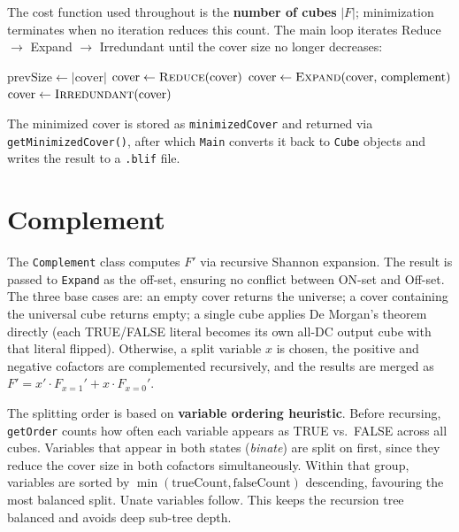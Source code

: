 The cost function used throughout is the \textbf{number of cubes} $|F|$; minimization terminates when no iteration reduces this count. The main loop iterates Reduce $\to$ Expand $\to$ Irredundant until the cover size no longer decreases:

\begin{algorithm}
\caption{Espresso main loop}
\begin{algorithmic}[1]
\Repeat
    \State $\text{prevSize} \gets |\text{cover}|$
    \State $\text{cover} \gets \textsc{Reduce}(\text{cover})$
    \State $\text{cover} \gets \textsc{Expand}(\text{cover},\, \text{complement})$
    \State $\text{cover} \gets \textsc{Irredundant}(\text{cover})$
\end{algorithmic}
\end{algorithm}

\noindent The minimized cover is stored as \texttt{minimizedCover} and returned via \texttt{getMinimizedCover()}, after which \texttt{Main} converts it back to \texttt{Cube} objects and writes the result to a \texttt{.blif} file.

\section{Complement}

The \texttt{Complement} class computes $F'$ via recursive Shannon expansion. The result is passed to \texttt{Expand} as the off-set, ensuring no conflict between ON-set and Off-set. The three base cases are: an empty cover returns the universe; a cover containing the universal cube returns empty; a single cube applies De Morgan's theorem directly (each TRUE/FALSE literal becomes its own all-\ac{DC} output cube with that literal flipped). Otherwise, a split variable $x$ is chosen, the positive and negative cofactors are complemented recursively, and the results are merged as $F' = x' \cdot F_{x=1}' + x \cdot F_{x=0}'$.

The splitting order is based on  \textbf{variable ordering heuristic}. Before recursing, \texttt{getOrder} counts how often each variable appears as TRUE vs.\ FALSE across all cubes. Variables that appear in both states (\emph{binate}) are split on first, since they reduce the cover size in both cofactors simultaneously. Within that group, variables are sorted by $\min(\text{trueCount}, \text{falseCount})$ descending, favouring the most balanced split. Unate variables follow. This keeps the recursion tree balanced and avoids deep sub-tree depth.

